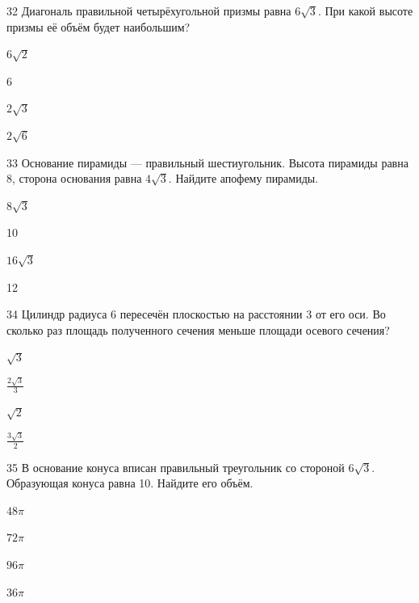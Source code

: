 \documentclass[14pt]{article}
\begin{document}
\begin{questionbox}{32}
    Диагональ правильной четырёхугольной призмы равна \(6\sqrt{3}\). При какой высоте призмы её объём будет наибольшим?
    \begin{options}
        \item \(6\sqrt{2}\)
        \item 6
        \item \(2\sqrt{3}\)
        \item \(2\sqrt{6}\)
    \end{options}
\end{questionbox}


\begin{questionbox}{33}
    Основание пирамиды — правильный шестиугольник. Высота пирамиды равна 8, сторона основания равна \(4\sqrt{3}\). Найдите апофему пирамиды.
    \begin{options}
        \item \(8\sqrt{3}\)
        \item 10
        \item \(16\sqrt{3}\)
        \item 12
    \end{options}
\end{questionbox}


\begin{questionbox}{34}
    Цилиндр радиуса 6 пересечён плоскостью на расстоянии 3 от его оси. Во сколько раз площадь полученного сечения меньше площади осевого сечения?
    \begin{options}
        \item \(\sqrt{3}\)
        \item \(\frac{2\sqrt{3}}{3}\)
        \item \(\sqrt{2}\)
        \item \(\frac{3\sqrt{3}}{2}\)
    \end{options}
\end{questionbox}


\begin{questionbox}{35}
    В основание конуса вписан правильный треугольник со стороной \(6\sqrt{3}\). Образующая конуса равна 10. Найдите его объём.
    \begin{options}
        \item \(48\pi\)
        \item \(72\pi\)
        \item \(96\pi\)
        \item \(36\pi\)
    \end{options}
\end{questionbox}
\end{document}
